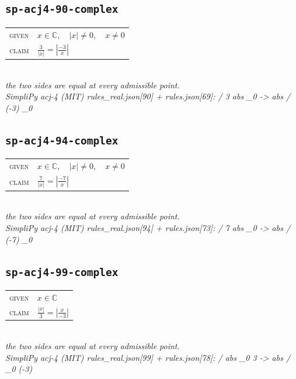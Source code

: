 \documentclass[11pt]{article}
\begin{document}
\subsection*{\texttt{sp-acj4-90-complex}}
\begin{tabular}{@{}l@{\quad}l@{}}
\textsc{given} & $x \in \mathbb{C},\quad \left|x\right| \neq 0,\quad x \neq 0$ \\[4pt]
\textsc{claim} & $\displaystyle \frac{3}{\left|x\right|} = \left|\frac{-3}{x}\right|$ \\
\end{tabular}\\[2pt]
{\small\emph{the two sides are equal at every admissible point.}}\\
\emph{SimpliPy acj-4 (MIT) rules\_real.json[90] + rules.json[69]: / 3 abs \_0  ->  abs / (-3) \_0}\\

\subsection*{\texttt{sp-acj4-94-complex}}
\begin{tabular}{@{}l@{\quad}l@{}}
\textsc{given} & $x \in \mathbb{C},\quad \left|x\right| \neq 0,\quad x \neq 0$ \\[4pt]
\textsc{claim} & $\displaystyle \frac{7}{\left|x\right|} = \left|\frac{-7}{x}\right|$ \\
\end{tabular}\\[2pt]
{\small\emph{the two sides are equal at every admissible point.}}\\
\emph{SimpliPy acj-4 (MIT) rules\_real.json[94] + rules.json[73]: / 7 abs \_0  ->  abs / (-7) \_0}\\

\subsection*{\texttt{sp-acj4-99-complex}}
\begin{tabular}{@{}l@{\quad}l@{}}
\textsc{given} & $x \in \mathbb{C}$ \\[4pt]
\textsc{claim} & $\displaystyle \frac{\left|x\right|}{3} = \left|\frac{x}{-3}\right|$ \\
\end{tabular}\\[2pt]
{\small\emph{the two sides are equal at every admissible point.}}\\
\emph{SimpliPy acj-4 (MIT) rules\_real.json[99] + rules.json[78]: / abs \_0 3  ->  abs / \_0 (-3)}\\
\end{document}
